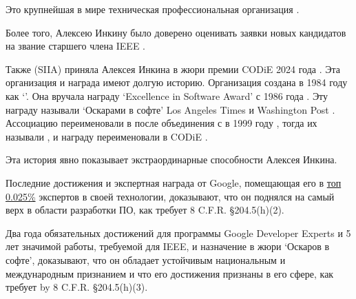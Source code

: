 Это крупнейшая в мире техническая профессиональная организация .

Более того, Алексею Инкину было доверено оценивать заявки новых кандидатов на звание старшего члена IEEE
.

Также \Siia (SIIA) приняла Алексея Инкина в жюри премии CODiE 2024 года .
Эта организация и награда имеют долгую историю.
Организация создана в 1984 году как `\Spa'.
Она вручала награду `Excellence in Software Award' с 1986 года .
Эту награду называли `Оскарами в софте' Los Angeles Times 
и Washington Post .
Ассоциацию переименовали в \Siia после объединения с \Iia в 1999 году ,
тогда их называли ,
и награду переименовали в CODiE .

Эта история явно показывает экстраординарные способности Алексея Инкина.

Последние достижения и экспертная награда от Google,
помещающая его в \ul{топ 0.025\%} экспертов в своей технологии,
доказывают, что он поднялся на самый верх в области разработки ПО,
как требует 8 C.F.R. §204.5(h)(2).

Два года обязательных достижений для программы Google Developer Experts
и 5 лет значимой работы, требуемой для IEEE,
и назначение в жюри `Оскаров в софте',
доказывают, что он обладает устойчивым национальным и международным признанием
и что его достижения признаны в его сфере,
как требует by 8 C.F.R. §204.5(h)(3).

\pagebreak


%
%
%
%
%
%
%
%

